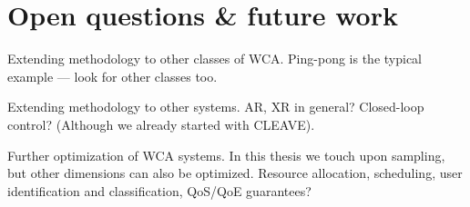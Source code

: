 \chapter{Open questions \& future work}

Extending methodology to other classes of \gls{WCA}.
Ping-pong is the typical example --- look for other classes too.

Extending methodology to other systems.
\gls{AR}, \gls{XR} in general?
Closed-loop control? (Although we already started with CLEAVE).

Further optimization of \gls{WCA} systems.
In this thesis we touch upon sampling, but other dimensions can also be optimized.
Resource allocation, scheduling, user identification and classification, QoS/QoE guarantees?